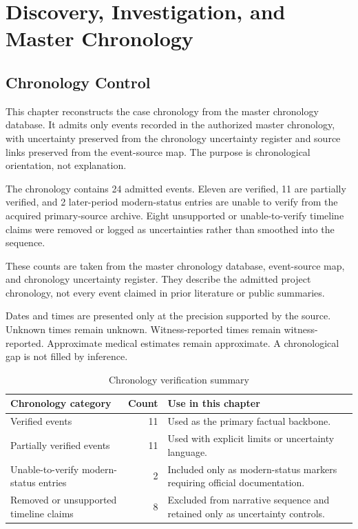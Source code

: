 \chapter{Discovery, Investigation, and Master Chronology}
\label{chap:discovery-investigation-master-chronology}


\section*{Chronology Control}

This chapter reconstructs the case chronology from the master chronology database. It admits only events recorded in the authorized master chronology, with uncertainty preserved from the chronology uncertainty register and source links preserved from the event-source map. The purpose is chronological orientation, not explanation.

The chronology contains 24 admitted events. Eleven are verified, 11 are partially verified, and 2 later-period modern-status entries are unable to verify from the acquired primary-source archive. Eight unsupported or unable-to-verify timeline claims were removed or logged as uncertainties rather than smoothed into the sequence.

These counts are taken from the master chronology database, event-source map, and chronology uncertainty register. They describe the admitted project chronology, not every event claimed in prior literature or public summaries.

Dates and times are presented only at the precision supported by the source. Unknown times remain unknown. Witness-reported times remain witness-reported. Approximate medical estimates remain approximate. A chronological gap is not filled by inference.

\begin{table}[htbp]
\centering
\caption{Chronology verification summary}
\label{tab:chronology-verification-summary}
\begin{tabularx}{\textwidth}{>{\RaggedRight\arraybackslash}p{}r>{\RaggedRight\arraybackslash}X}
\toprule
Chronology category & Count & Use in this chapter \\
\midrule
Verified events & 11 & Used as the primary factual backbone. \\
Partially verified events & 11 & Used with explicit limits or uncertainty language. \\
Unable-to-verify modern-status entries & 2 & Included only as modern-status markers requiring official documentation. \\
Removed or unsupported timeline claims & 8 & Excluded from narrative sequence and retained only as uncertainty controls. \\
\bottomrule
\end{tabularx}
\end{table}

